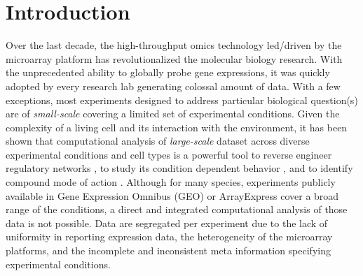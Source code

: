 
\section{Introduction}

Over the last decade, the high-throughput omics technology led/driven by the 
microarray platform has revolutionalized the molecular biology research. 
With the unprecedented ability to globally probe gene expressions, it was 
quickly adopted by every research lab generating colossal amount of data. 
With a few exceptions, most experiments designed to address particular 
biological question(s) are of \textit{small-scale} covering a limited set of 
experimental conditions.
Given the complexity of a living cell and its interaction with the 
environment, it has been shown that computational analysis of 
\textit{large-scale} dataset across diverse experimental conditions and cell 
types is a powerful tool to reverse engineer regulatory networks 
\cite{Faith2007, Basso2005, Ernst2008}, to study its condition dependent 
behavior \cite{Lemmens2009, Fadda2009}, and to identify compound mode of 
action  \cite{Gardner2003, Basso2005, DiBernardo2005}.
Although for many species, experiments publicly available in Gene Expression 
Omnibus (GEO) \cite{Barrett2011} or ArrayExpress \cite{Parkinson2009} cover 
a broad range of the conditions, a direct and integrated computational analysis 
of those data is not possible.
Data are segregated per experiment due to the lack of uniformity in 
reporting expression data, the heterogeneity of the microarray platforms, 
and the incomplete and inconsistent meta information specifying experimental 
conditions.

